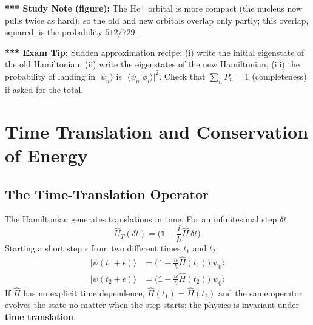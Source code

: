 \documentclass[11pt,a4paper]{article}
\begin{document}
\begin{center}
\end{center}
\textbf{*** Study Note (figure):} The He$^+$ orbital is more compact (the nucleus now pulls twice as hard), so the old and new orbitals overlap only partly; this overlap, squared, is the probability $512/729$.

\textbf{*** Exam Tip:} Sudden approximation recipe: (i) write the initial eigenstate of the old Hamiltonian, (ii) write the eigenstates of the new Hamiltonian, (iii) the probability of landing in $|\psi_n\rangle$ is $|\langle\psi_n|\phi_i\rangle|^2$. Check that $\sum_n P_n=1$ (completeness) if asked for the total.
\section{Time Translation and Conservation of Energy}

\subsection{The Time-Translation Operator}
The Hamiltonian generates translations in time. For an infinitesimal step $\delta t$,
\[
\hat U_T(\delta t)=\Big(\mathbb 1-\frac i\hbar\hat H\,\delta t\Big)
\]
Starting a short step $\epsilon$ from two different times $t_1$ and $t_2$:
\begin{align*}
|\psi(t_1+\epsilon)\rangle&=\Big(\mathbb 1-\frac{i\epsilon}{\hbar}\hat H(t_1)\Big)|\psi_0\rangle\\
|\psi(t_2+\epsilon)\rangle&=\Big(\mathbb 1-\frac{i\epsilon}{\hbar}\hat H(t_2)\Big)|\psi_0\rangle
\end{align*}
If $\hat H$ has no explicit time dependence, $\hat H(t_1)=\hat H(t_2)$ and the same operator evolves the state no matter when the step starts: the physics is invariant under \textbf{time translation}.
\end{document}

